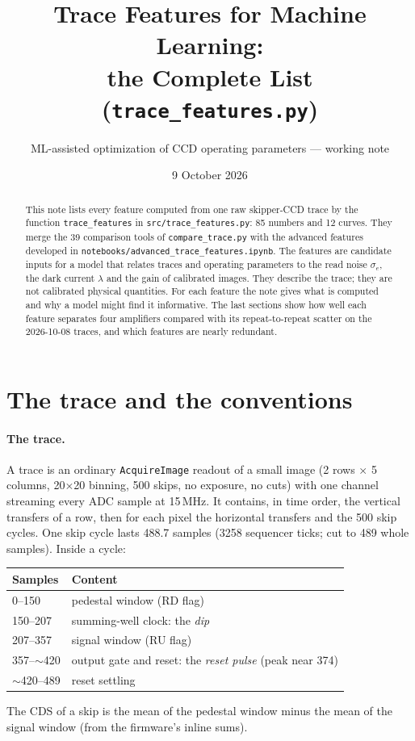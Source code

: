 \documentclass[10pt]{article}
\title{Trace Features for Machine Learning:\\ the Complete List (\texttt{trace\_features.py})}
\author{ML-assisted optimization of CCD operating parameters --- working note}
\date{9 October 2026}
\newcommand{\code}[1]{\texttt{#1}}
\begin{document}
\maketitle

\begin{abstract}
This note lists every feature computed from one raw skipper-CCD trace by the function \code{trace\_features} in
\code{src/trace\_features.py}: 85 numbers and 12 curves. They merge the 39
comparison tools of \code{compare\_trace.py} with the advanced features developed in
\code{notebooks/advanced\_trace\_features.ipynb}. The features are candidate inputs for a model that relates traces and
operating parameters to the read noise $\sigma_e$, the dark current $\lambda$ and the gain of calibrated images. They describe
the trace; they are not calibrated physical quantities. For each feature the note gives what is computed and why a model
might find it informative. The last sections show how well each feature separates four amplifiers compared with its
repeat-to-repeat scatter on the 2026-10-08 traces, and which features are nearly redundant.
\end{abstract}

\tableofcontents

\section{The trace and the conventions}

\paragraph{The trace.} A trace is an ordinary \code{AcquireImage} readout of a small image (2 rows $\times$ 5 columns,
20$\times$20 binning, 500 skips, no exposure, no cuts) with one channel streaming every ADC sample at 15\,MHz. It contains, in time
order, the vertical transfers of a row, then for each pixel the horizontal transfers and the 500 skip cycles. One skip cycle
lasts 488.7 samples (3258 sequencer ticks; cut to 489 whole samples). Inside a cycle:
\begin{center}
\begin{tabular}{ll}
\toprule
Samples & Content \\
\midrule
0--150 & pedestal window (RD flag) \\
150--207 & summing-well clock: the \emph{dip} \\
207--357 & signal window (RU flag) \\
357--$\sim$420 & output gate and reset: the \emph{reset pulse} (peak near 374) \\
$\sim$420--489 & reset settling \\
\bottomrule
\end{tabular}
\end{center}
The CDS of a skip is the mean of the pedestal window minus the mean of the signal window (from the firmware's inline sums).
\end{document}
